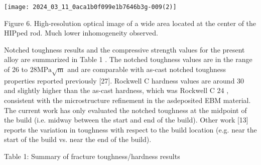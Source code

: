\documentclass[10pt]{article}
\begin{document}
\begin{center}
\texttt{[image: 2024\_03\_11\_0aca1b0f099e1b7646b3g-009(2)]}
\end{center}

Figure 6. High-resolution optical image of a wide area located at the center of the HIPped rod. Much lower inhomogeneity observed.

Notched toughness results and the compressive strength values for the present alloy are summarized in Table 1 . The notched toughness values are in the range of 26 to $28 \mathrm{MPa} \sqrt{\mathrm{m}}$ and are comparable with as-cast notched toughness properties reported previously [27]. Rockwell $\mathrm{C}$ hardness values are around 30 and slightly higher than the as-cast hardness, which was Rockwell $\mathrm{C}$ 24 , consistent with the microstructure refinement in the asdeposited EBM material. The current work has only evaluated the notched toughness at the midpoint of the build (i.e. midway between the start and end of the build). Other work [13] reports the variation in toughness with respect to the build location (e.g. near the start of the build vs. near the end of the build).

Table 1: Summary of fracture toughness/hardness results
\end{document}
